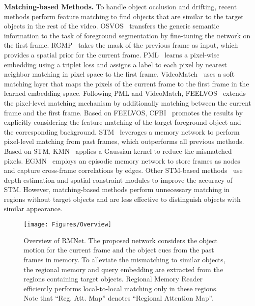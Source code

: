 \documentclass[final]{cvpr}
\begin{document}
\noindent \textbf{Matching-based Methods.}
To handle object occlusion and drifting, recent methods perform feature matching to find objects that are similar to the target objects in the rest of the video.
OSVOS~\cite{DBLP:conf/cvpr/CaellesMPLCG17} transfers the generic semantic information to the task of foreground segmentation by fine-tuning the network on the first frame.
RGMP~\cite{DBLP:conf/cvpr/OhLSK18} takes the mask of the previous frame as input, which provides a spatial prior for the current frame.
PML~\cite{DBLP:conf/cvpr/ChenPMG18} learns a pixel-wise embedding using a triplet loss and assigns a label to each pixel by nearest neighbor matching in pixel space to the first frame.
VideoMatch~\cite{DBLP:conf/eccv/HuHS18a} uses a soft matching layer that maps the pixels of the current frame to the first frame in the learned embedding space.
Following PML and VideoMatch, FEELVOS~\cite{DBLP:conf/cvpr/VoigtlaenderCSA19} extends the pixel-level matching mechanism by additionally matching between the current frame and the first frame.
Based on FEELVOS, CFBI~\cite{DBLP:conf/eccv/YangWY20} promotes the results by explicitly considering the feature matching of the target foreground object and the corresponding background. 
STM~\cite{DBLP:conf/iccv/OhLXK19} leverages a memory network to perform pixel-level matching from past frames, which outperforms all previous methods.
Based on STM, KMN~\cite{DBLP:conf/eccv/SeongHK20} applies a Gaussian kernel to reduce the mismatched pixels.
EGMN~\cite{DBLP:conf/eccv/LuWDZSG20} employs an episodic memory network to store frames as nodes and capture cross-frame correlations by edges.
Other STM-based methods~\cite{DBLP:conf/cvpr/XieHXLS20,DBLP:conf/cvpr/ZhangHZP20} use depth estimation and spatial constraint modules to improve the accuracy of STM.
However, matching-based methods perform unnecessary matching in regions without target objects and are less effective to distinguish objects with similar appearance.

\begin{figure*}[!t]
  \resizebox{\linewidth}{!} {
    \texttt{[image: Figures/Overview]}
  }
  \caption{Overview of RMNet.
  The proposed network considers the object motion for the current frame and the object cues from the past frames in memory.
  To alleviate the mismatching to similar objects, the regional memory and query embedding are extracted from the regions containing target objects.
  Regional Memory Reader efficiently performs local-to-local matching only in these regions.
  Note that ``Reg. Att. Map'' denotes ``Regional Attention Map''.}
  \label{fig:overview}
  \vspace{-2 mm}
\end{figure*}
\end{document}
